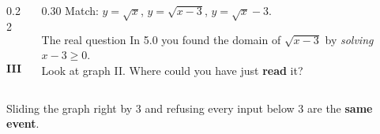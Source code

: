 \documentclass[aspectratio=169, 11pt]{beamer}
\newcommand{\lgrid}[4]{%
  \draw[step=1, linegray!45, thin] (#1,#3) grid (#2,#4);
  \draw[->, thick, charcoal] (#1,0)--(#2,0) node[below right, font=\tiny]{$x$};
  \draw[->, thick, charcoal] (0,#3)--(0,#4) node[left, font=\tiny]{$y$};}
\begin{document}
\begin{frame}[t, plain]
\begin{columns}[T]
\begin{column}{0.22\textwidth}
\\[2pt]
      {\footnotesize \textbf{III}}
    \end{column}
    \begin{column}{0.30\textwidth}
      \footnotesize
      Match: \; $y=\sqrt{x}$, \; $y=\sqrt{x-3}$, \; $y=\sqrt{x}-3$.
      \vspace{4pt}
      \begin{block}{The real question}
        In 5.0 you found the domain of $\sqrt{x-3}$ by \emph{solving} $x-3\ge0$. \\[3pt]
        Look at graph II. Where could you have just \textbf{read} it?
      \end{block}
    \end{column}
  \end{columns}
  \vspace{2pt}
  \begin{center}
    Sliding the graph right by $3$ and refusing every input below $3$ are the \textbf{same event}.
  \end{center}
\end{frame}
\end{document}
